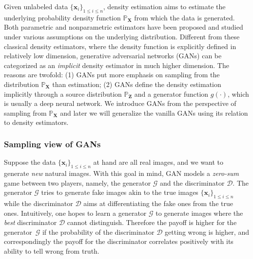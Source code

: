 Given unlabeled data $\{\bm{x}_{i}\}_{1\leq i\leq n}$, density estimation
aims to estimate the underlying probability density function $\mathbb{P}_{\bm{X}}$
from which the data is generated. Both parametric and nonparametric
estimators \citep{silverman2018density} have been proposed and studied under various assumptions
on the underlying distribution. Different from these classical density estimators, where the density function is explicitly defined in relatively low dimension, generative adversarial networks (GANs) \citep{goodfellow2014generative} can be categorized as an \emph{implicit} density estimator in much higher dimension. The reasons are twofold: (1) GANs put more emphasis on sampling from
the distribution $\mathbb{P}_{\bm{X}}$ than estimation; (2) GANs define the density estimation implicitly through a source distribution $\mathbb{P}_{\bm{Z}}$ and a generator function $g(\cdot)$, which is usually a deep neural network. We introduce GANs from the perspective of sampling from $\mathbb{P}_{\bm{X}}$ and later we will generalize the vanilla GANs using its relation to density estimators.

\subsubsection{Sampling view of GANs}
Suppose the data $\{\bm{x}_{i}\}_{1\leq i\leq n}$ at hand are all real images, and we want to generate \emph{new} natural images.
With this goal in mind, GAN models a \emph{zero-sum} game between two players, namely,
the generator $\mathcal{G}$ and the discriminator $\mathcal{D}$. The
generator $\mathcal{G}$ tries to generate fake images akin to the
true images $\{\bm{x}_{i}\}_{1\leq i\leq n}$ while the discriminator
$\mathcal{D}$ aims at differentiating the fake ones from
the true ones. Intuitively, one hopes to learn a generator $\mathcal{G}$ to generate images where the \emph{best} discriminator $\mathcal{D}$ cannot distinguish. Therefore the payoff is higher for the generator~$\mathcal{G}$ if the probability of the discriminator $\mathcal{D}$
getting wrong is higher, and correspondingly the payoff for the discriminator
correlates positively with its ability to tell wrong from truth.


